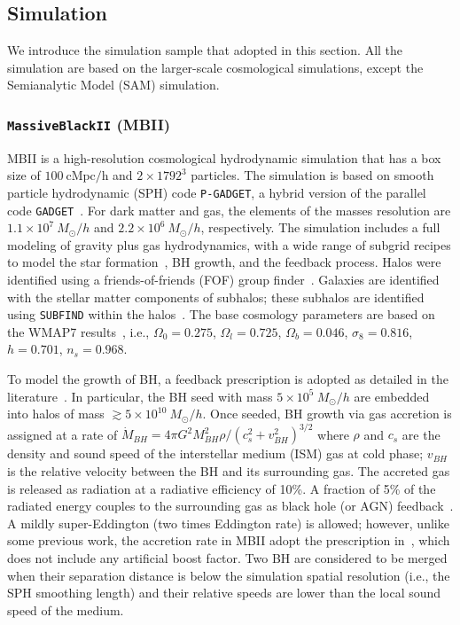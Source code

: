 \documentclass[twocolumn]{aastex631}
\newcommand{\todo}[1]{\textcolor{red}{[{\bf TODO}: #1]}}
\begin{document}
\subsection{Simulation}
We introduce the simulation sample that adopted in this section. All the simulation are based on the larger-scale cosmological simulations, except the Semianalytic Model (SAM) simulation.

\subsubsection{{\tt MassiveBlackII} (MBII)}
MBII is a high-resolution cosmological hydrodynamic simulation that has a box size of $100~\mathrm{cMpc/h}$ and $2\times1792^3$ particles. The simulation is based on smooth particle hydrodynamic (SPH) code \texttt{P-GADGET}, a hybrid version of the parallel code {\tt GADGET}~\citep{2005MNRAS.364.1105S}. For dark matter and gas, the elements of the masses resolution are $1.1\times 10^7~M_{\odot}/h$ and $2.2\times 10^6~M_{\odot}/h$, respectively. The simulation includes a full modeling of gravity plus gas hydrodynamics, with a wide range of subgrid recipes to model the star formation~\citep{2003MNRAS.339..289S}, BH growth, and the feedback process. Halos were identified using a friends-of-friends (FOF) group finder~\citep{1985ApJ...292..371D}. Galaxies are identified with the stellar matter components of subhalos; these subhalos are identified using {\tt SUBFIND} within the halos~\citep{2005MNRAS.364.1105S}. The base cosmology parameters are based on the WMAP7 results~\citep{2011ApJS..192...18K}, i.e., $\Omega_0=0.275$, $\Omega_l=0.725$, $\Omega_b=0.046$, $\sigma_8=0.816$, $h = 0.701$, $n_s=0.968$.

To model the growth of BH, a feedback prescription is adopted as detailed in the literature~\citep{2005Natur.433..604D, 2005MNRAS.361..776S}. In particular, the BH seed with mass $5\times 10^{5}~M_{\odot}/h$ are embedded into halos of mass $\gtrsim 5\times 10^{10}~M_{\odot}/h$. Once seeded, BH growth via gas accretion is assigned at a rate of $\dot{M}_{BH}={4\pi G^2 M_{BH}^2 \rho}/{(c_s^2+v_{BH}^2)^{3/2}}$ where $\rho$ and $c_s$ are the density and sound speed of the interstellar medium (ISM) gas at cold phase; $v_{BH}$ is the relative velocity between the BH and its surrounding gas. The accreted gas is released as radiation at a radiative efficiency of 10\%. A fraction of 5\% of the radiated energy couples to the surrounding gas as black hole (or AGN) feedback~\citep{2005Natur.433..604D}. A mildly super-Eddington (two times Eddington rate) is allowed; however, unlike some previous work, the accretion rate in MBII adopt the prescription in~\citet{Pelupessy2007}, which does not include any artificial boost factor. Two BH are considered to be merged when their separation distance is below the simulation spatial resolution (i.e., the SPH smoothing length) and their relative speeds are lower than the local sound speed of the medium.
\end{document}
